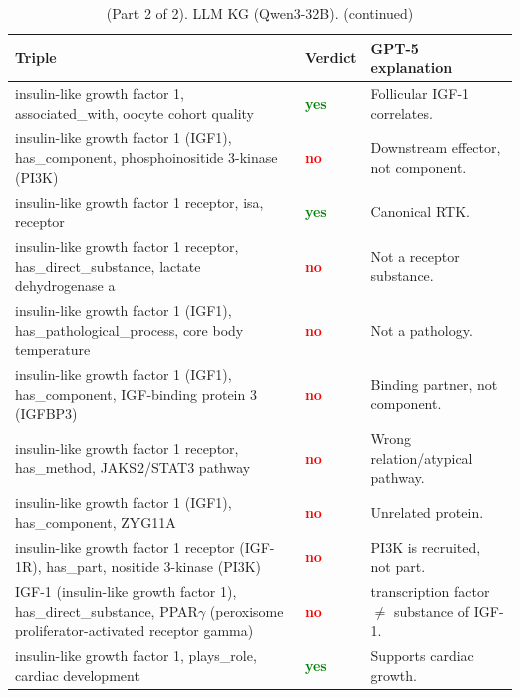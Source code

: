\documentclass[10pt]{article}
\begin{document}
\begin{appendices}
\begin{table}[t]
\ContinuedFloat %
\centering
\caption{(Part 2 of 2). LLM KG (Qwen3-32B). (continued)}
\begin{tabularx}{\linewidth}{
  >{\hsize=1.3\hsize\raggedright\arraybackslash}X  %
  p{3em}                                           %
  >{\hsize=0.7\hsize\raggedright\arraybackslash}X  %
}
\rowcolor{gray!30}
\textbf{Triple} & \textbf{Verdict} & \textbf{GPT-5 explanation} \\
\midrule
insulin-like growth factor 1, associated\_with, oocyte cohort quality & \textcolor{Green}{\bf yes} & Follicular IGF-1 correlates. \\
insulin-like growth factor 1 (IGF1), has\_component, phosphoinositide 3-kinase (PI3K) & \textcolor{red}{\bf no} & Downstream effector, not component. \\
insulin-like growth factor 1 receptor, isa, receptor & \textcolor{Green}{\bf yes} & Canonical RTK. \\
insulin-like growth factor 1 receptor, has\_direct\_substance, lactate dehydrogenase a & \textcolor{red}{\bf no} & Not a receptor substance. \\
insulin-like growth factor 1 (IGF1), has\_pathological\_process, core body temperature & \textcolor{red}{\bf no} & Not a pathology. \\
insulin-like growth factor 1 (IGF1), has\_component, IGF-binding protein 3 (IGFBP3) & \textcolor{red}{\bf no} & Binding partner, not component. \\
insulin-like growth factor 1 receptor, has\_method, JAKS2/STAT3 pathway & \textcolor{red}{\bf no} & Wrong relation/atypical pathway. \\
insulin-like growth factor 1 (IGF1), has\_component, ZYG11A & \textcolor{red}{\bf no} & Unrelated protein. \\
insulin-like growth factor 1 receptor (IGF-1R), has\_part, nositide 3-kinase (PI3K) & \textcolor{red}{\bf no} & PI3K is recruited, not part. \\
IGF-1 (insulin-like growth factor 1), has\_direct\_substance, PPAR$\gamma$ (peroxisome proliferator-activated receptor gamma) & \textcolor{red}{\bf no} & transcription factor $\neq$ substance of IGF-1. \\
insulin-like growth factor 1, plays\_role, cardiac development & \textcolor{Green}{\bf yes} & Supports cardiac growth. \\
\bottomrule
\end{tabularx}
\end{table}





\end{appendices}
\end{document}
